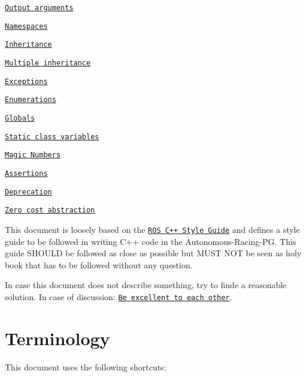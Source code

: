\begin{DoxyItemize}
\item \href{#output-arguments}{\tt Output arguments}
\item \href{#namespaces-1}{\tt Namespaces}
\item \href{#inheritance}{\tt Inheritance}
\begin{DoxyItemize}
\item \href{#multiple-inheritance}{\tt Multiple inheritance}
\end{DoxyItemize}
\item \href{#exceptions}{\tt Exceptions}
\item \href{#enumerations}{\tt Enumerations}
\item \href{#globals}{\tt Globals}
\item \href{#static-class-variables}{\tt Static class variables}
\item \href{#magic-numbers}{\tt Magic Numbers}
\item \href{#assertions}{\tt Assertions}
\item \href{#deprecation}{\tt Deprecation}
\item \href{#zero-cost-abstraction}{\tt Zero cost abstraction}
\end{DoxyItemize}

This document is loosely based on the \href{http://wiki.ros.org/CppStyleGuide}{\tt R\+OS C++ Style Guide} and defines a style guide to be followed in writing C++ code in the Autonomous-\/\+Racing-\/\+PG. This guide S\+H\+O\+U\+LD be followed as close as possible but M\+U\+ST N\+OT be seen as holy book that has to be followed without any question.

In case this document does not describe something, try to finde a reasonable solution. In case of discussion\+: \href{https://www.youtube.com/watch?v=rph_1DODXDU}{\tt Be excellent to each other}.

\section*{Terminology}

This document uses the following shortcuts\+:


